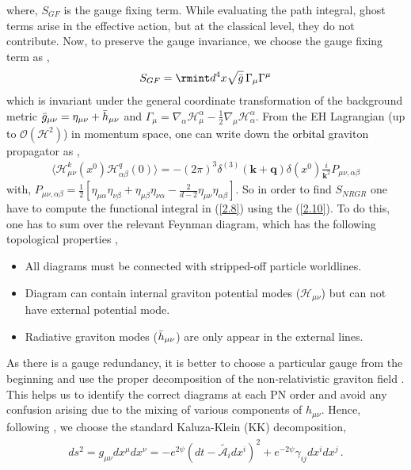 where, $S_{GF}$ is the gauge fixing term. While evaluating the path integral, ghost terms arise in the effective action, but at the classical level, they do not contribute. Now, to preserve the gauge invariance, we choose the gauge fixing term as \cite{Goldberger:2004jt},
\begin{eqnarray}
    S_{GF}=\rmint d^4x\sqrt{\Bar{g}}\,\Gamma_\mu \Gamma^\mu
\end{eqnarray}
which is invariant under the general coordinate transformation of the background metric $\Bar{g}_{\mu\nu}=\eta_{\mu\nu}+\Bar{h}_{\mu\nu}$ and $\Gamma_\mu=\nabla_{\alpha}\mathcal{H}^{\alpha}_{\mu}-\frac{1}{2}\nabla_{\mu}\mathcal{H}_{\alpha}^{\alpha}.$ From the EH Lagrangian (up to $\mathcal{O}(\mathcal{H}^2)$) in momentum space, one can write down the \textcolor{black}{orbital} graviton propagator as \cite{Goldberger:2004jt},
\begin{eqnarray}
    \Big\langle\mathcal{H}^{k}_{\mu\nu}(x^0)\mathcal{H}^{q}_{\alpha\beta}(0)\Big\rangle=-(2\pi)^3 \delta^{(3)}(\boldsymbol{k}+\boldsymbol{q})\delta(x^0)\frac{i}{\boldsymbol{k}^2}P_{\mu\nu,\alpha\beta}\label{2.10}
\end{eqnarray}
with, $P_{\mu\nu,\alpha\beta}=\frac{1}{2}[\eta_{\mu\alpha}\eta_{\nu\beta}+\eta_{\mu\beta}\eta_{\nu\alpha}-\frac{2}{d-2}\eta_{\mu\nu}\eta_{\alpha\beta}]$. So in order to find $S_{NRGR}$ one have to compute the functional integral in (\ref{2.8}) using the (\ref{2.10}). To do this, one has to sum over the relevant Feynman diagram, which has the following topological properties \cite{Goldberger:2022ebt, Goldberger:2004jt},
\begin{itemize}
    \item All diagrams must be connected with stripped-off particle worldlines.
    \item Diagram can contain internal graviton potential modes ($\mathcal{H}_{\mu\nu}$) but can not have external potential mode.
    \item Radiative graviton modes ($\Bar{h}_{\mu\nu}$) are only appear in the external lines.
\end{itemize}
As there is a gauge redundancy, it is better to choose a particular gauge from the beginning and use the proper decomposition of the non-relativistic graviton field \cite{Kol:2007bc}. This helps us to identify the correct diagrams at each PN order and avoid any confusion arising due to the mixing of various components of $h_{\mu\nu}$. Hence, following \cite{Kol:2007bc}, we choose the standard Kaluza-Klein (KK) decomposition,
\begin{align}
    \begin{split}
        ds^2=g_{\mu\nu}dx^{\mu}dx^{\nu}=-e^{2\psi}(dt-\tilde{\mathcal{A}_i}dx^{i})^2+e^{-2{\psi}}\gamma_{ij}dx^{i}dx^{j}\,.
    \end{split} \label{KK}
\end{align}
